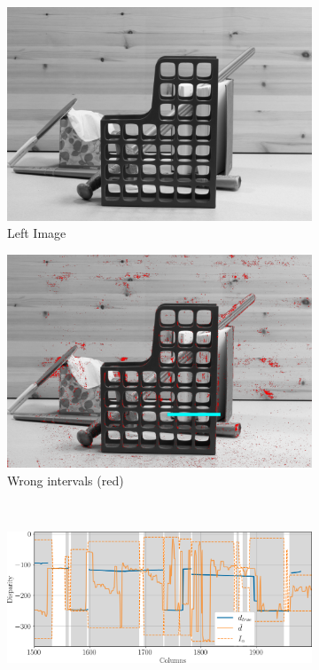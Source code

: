 \begin{figure}
    \centering
    \begin{subfigure}[t]{0.5\linewidth}
        \centering
        \includegraphics[width=\linewidth]{Images/Chap_5/Sword2-perfect_2014.png}
        \caption{Left Image}
        \label{fig:sword2_a}
    \end{subfigure}\hfill
    \begin{subfigure}[t]{0.5\linewidth}
        \centering
        \includegraphics[width=\linewidth]{Images/Chap_5/Sword2-perfect_2014_error.png}
        \caption{Wrong intervals (red)}
        \label{fig:sword2_b}
    \end{subfigure}\\
    \begin{subfigure}[t]{1\linewidth}
        \centering
        \includegraphics[width=\linewidth]{Images/Chap_5/Sword2-perfect_2014_row_1500.png}

\end{subfigure}
\end{figure}
